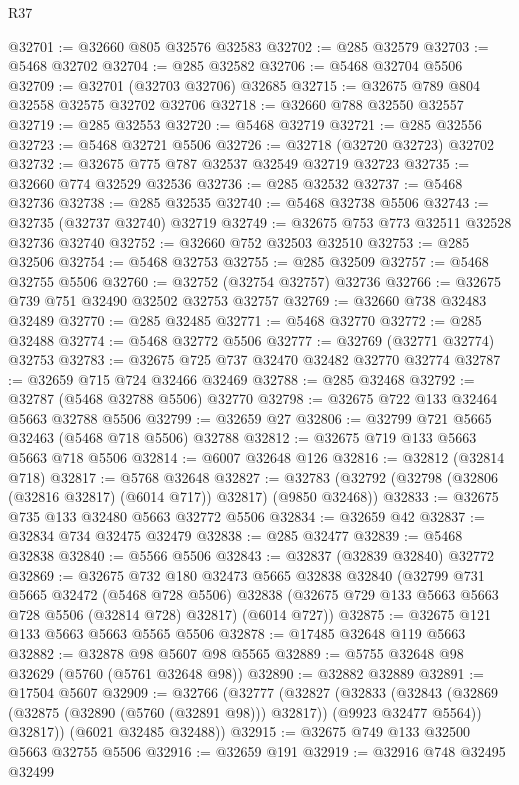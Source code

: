\begin{lexlean}{R37}
\begin{coremodule}
@32701 := @32660 @805 @32576 @32583
@32702 := @285 @32579
@32703 := @5468 @32702
@32704 := @285 @32582
@32706 := @5468 @32704 @5506
@32709 := @32701 (@32703 @32706) @32685
@32715 := @32675 @789 @804 @32558 @32575 @32702 @32706
@32718 := @32660 @788 @32550 @32557
@32719 := @285 @32553
@32720 := @5468 @32719
@32721 := @285 @32556
@32723 := @5468 @32721 @5506
@32726 := @32718 (@32720 @32723) @32702
@32732 := @32675 @775 @787 @32537 @32549 @32719 @32723
@32735 := @32660 @774 @32529 @32536
@32736 := @285 @32532
@32737 := @5468 @32736
@32738 := @285 @32535
@32740 := @5468 @32738 @5506
@32743 := @32735 (@32737 @32740) @32719
@32749 := @32675 @753 @773 @32511 @32528 @32736 @32740
@32752 := @32660 @752 @32503 @32510
@32753 := @285 @32506
@32754 := @5468 @32753
@32755 := @285 @32509
@32757 := @5468 @32755 @5506
@32760 := @32752 (@32754 @32757) @32736
@32766 := @32675 @739 @751 @32490 @32502 @32753 @32757
@32769 := @32660 @738 @32483 @32489
@32770 := @285 @32485
@32771 := @5468 @32770
@32772 := @285 @32488
@32774 := @5468 @32772 @5506
@32777 := @32769 (@32771 @32774) @32753
@32783 := @32675 @725 @737 @32470 @32482 @32770 @32774
@32787 := @32659 @715 @724 @32466 @32469
@32788 := @285 @32468
@32792 := @32787 (@5468 @32788 @5506) @32770
@32798 := @32675 @722 @133 @32464 @5663 @32788 @5506
@32799 := @32659 @27
@32806 := @32799 @721 @5665 @32463 (@5468 @718 @5506) @32788
@32812 := @32675 @719 @133 @5663 @5663 @718 @5506
@32814 := @6007 @32648 @126
@32816 := @32812 (@32814 @718)
@32817 := @5768 @32648
@32827 := @32783 (@32792 (@32798 (@32806 (@32816 @32817) (@6014 @717)) @32817) (@9850 @32468))
@32833 := @32675 @735 @133 @32480 @5663 @32772 @5506
@32834 := @32659 @42
@32837 := @32834 @734 @32475 @32479
@32838 := @285 @32477
@32839 := @5468 @32838
@32840 := @5566 @5506
@32843 := @32837 (@32839 @32840) @32772
@32869 := @32675
    @732
    @180
    @32473
    @5665
    @32838
    @32840
    (@32799
      @731
      @5665
      @32472
      (@5468 @728 @5506)
      @32838
      (@32675 @729 @133 @5663 @5663 @728 @5506 (@32814 @728) @32817)
      (@6014 @727))
@32875 := @32675 @121 @133 @5663 @5663 @5565 @5506
@32878 := @17485 @32648 @119 @5663
@32882 := @32878 @98 @5607 @98 @5565
@32889 := @5755 @32648 @98 @32629 (@5760 (@5761 @32648 @98))
@32890 := @32882 @32889
@32891 := @17504 @5607
@32909 := @32766
    (@32777
      (@32827
        (@32833
          (@32843 (@32869 (@32875 (@32890 (@5760 (@32891 @98))) @32817)) (@9923 @32477 @5564))
          @32817))
      (@6021 @32485 @32488))
@32915 := @32675 @749 @133 @32500 @5663 @32755 @5506
@32916 := @32659 @191
@32919 := @32916 @748 @32495 @32499

\end{coremodule}
\end{lexlean}
